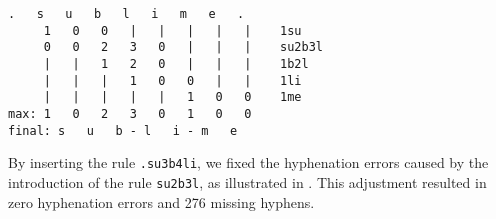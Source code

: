 \noindent\begin{minipage}{\linewidth}
\begin{lstlisting}[language={}, caption={Hyphenation of the word \emph{sublime} after the indroduction of rule \texttt{su2b3l}. 
This rule introduces a wrong hyphenation point, demanding an exception rule to fix it.}, label=sublimehyphenation]
   .   s   u   b   l   i   m   e   .
     1   0   0   |   |   |   |   |    1su
     0   0   2   3   0   |   |   |    su2b3l
     |   |   1   2   0   |   |   |    1b2l
     |   |   |   1   0   0   |   |    1li
     |   |   |   |   |   1   0   0    1me
max: 1   0   2   3   0   1   0   0
final: s   u   b - l   i - m   e
\end{lstlisting}
\end{minipage}
\noindent{}By inserting the rule \texttt{.su3b4li}, we fixed the hyphenation errors caused by the introduction of the rule \texttt{su2b3l},
as illustrated in . This adjustment resulted in zero hyphenation errors and 276 missing hyphens.


